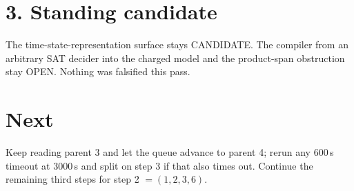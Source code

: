 \documentclass[11pt]{article}
\begin{document}
\section*{3. Standing candidate}
The time-state-representation surface stays CANDIDATE. The compiler from an arbitrary SAT decider into the charged model and the product-span obstruction stay OPEN. Nothing was falsified this pass.

\section*{Next}
Keep reading parent 3 and let the queue advance to parent 4; rerun any 600\,s timeout at 3000\,s and split on step 3 if that also times out. Continue the remaining third steps for step 2 $=(1,2,3,6)$.
\end{document}
